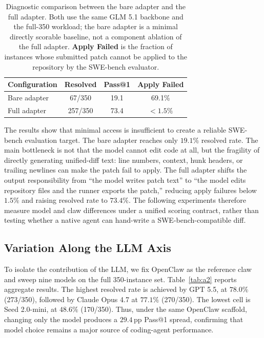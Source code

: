 \documentclass{llmxive}
\providecommand{\arraystretch}{1.0}
\begin{document}
\begin{table}[t]
  \centering
  \scriptsize
  \renewcommand{\arraystretch}{1.0}
  \setlength{\tabcolsep}{4pt}
  \begin{tabular*}{0.95\linewidth}{@{\extracolsep{\fill}}lccc@{}}
    \toprule
    \textbf{Configuration} & \textbf{Resolved} & \textbf{Pass@1} & \textbf{Apply Failed} \\
    \midrule
    Bare adapter & 67/350 & 19.1 & 69.1\%\\
    Full adapter & 257/350 & 73.4 & $<1.5\%$ \\
    \bottomrule
  \end{tabular*}
\caption{Diagnostic comparison between the bare adapter and the full adapter. Both use the same GLM 5.1 backbone and the full-350 workload; the bare adapter is a minimal directly scorable baseline, not a component ablation of the full adapter. \textbf{Apply Failed} is the fraction of instances whose submitted patch cannot be applied to the repository by the SWE-bench evaluator.}
\label{tab:adapter_diagnostic}
\end{table}

The results show that minimal access is insufficient to create a reliable SWE-bench evaluation target. The bare adapter reaches only $19.1\%$ resolved rate. The main bottleneck is not that the model cannot edit code at all, but the fragility of directly generating unified-diff text: line numbers, context, hunk headers, or trailing newlines can make the patch fail to apply. The full adapter shifts the output responsibility from ``the model writes patch text'' to ``the model edits repository files and the runner exports the patch,'' reducing apply failures below $1.5\%$ and raising resolved rate to $73.4\%$. The following experiments therefore measure model and claw differences under a unified scoring contract, rather than testing whether a native agent can hand-write a SWE-bench-compatible diff.

\subsection{Variation Along the LLM Axis}\label{sec:variation_llms}

To isolate the contribution of the LLM, we fix OpenClaw as the reference claw and sweep nine models on the full 350-instance set. Table~\ref{tab:a2} reports aggregate results. The highest resolved rate is achieved by GPT 5.5, at $78.0\%$ (273/350), followed by Claude Opus 4.7 at $77.1\%$ (270/350). The lowest cell is Seed 2.0-mini, at $48.6\%$ (170/350). Thus, under the same OpenClaw scaffold, changing only the model produces a $29.4$\,pp Pass@1 spread, confirming that model choice remains a major source of coding-agent performance.
\end{document}
